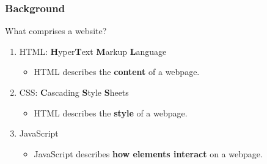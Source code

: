 \begin{frame}
    \frametitle{Background}

    What comprises a website?
    \bigskip

    \begin{enumerate}[<+->]
        \setlength\itemsep{2em}
        \item HTML: \textbf{H}yper\textbf{T}ext \textbf{M}arkup \textbf{L}anguage
        \begin{itemize}
            \item HTML describes the \textbf{content} of a webpage.
        \end{itemize}
        \item CSS: \textbf{C}ascading \textbf{S}tyle \textbf{S}heets
        \begin{itemize}
            \item HTML describes the \textbf{style} of a webpage.
        \end{itemize}
        \item JavaScript
        \begin{itemize}
            \item JavaScript describes \textbf{how elements interact} on a webpage.
        \end{itemize}
    \end{enumerate}

    \bigskip
\end{frame}